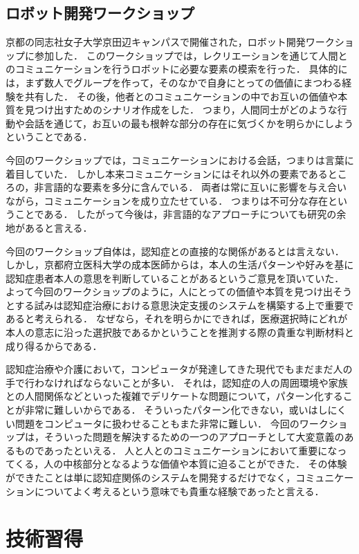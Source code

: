\documentclass[../report]{subfiles}
\begin{document}
\subsection{ロボット開発ワークショップ}
京都の同志社女子大学京田辺キャンパスで開催された，ロボット開発ワークショップに参加した．
このワークショップでは，レクリエーションを通じて人間とのコミュニケーションを行うロボットに必要な要素の模索を行った．
具体的には，まず数人でグループを作って，そのなかで自身にとっての価値にまつわる経験を共有した．
その後，他者とのコミュニケーションの中でお互いの価値や本質を見つけ出すためのシナリオ作成をした．
つまり，人間同士がどのような行動や会話を通じて，お互いの最も根幹な部分の存在に気づくかを明らかにしようということである．

今回のワークショップでは，コミュニケーションにおける会話，つまりは言葉に着目していた．
しかし本来コミュニケーションにはそれ以外の要素であるところの，非言語的な要素を多分に含んでいる．
両者は常に互いに影響を与え合いながら，コミュニケーションを成り立たせている．
つまりは不可分な存在ということである．
したがって今後は，非言語的なアプローチについても研究の余地があると言える．

今回のワークショップ自体は，認知症との直接的な関係があるとは言えない．
しかし，京都府立医科大学の成本医師からは，本人の生活パターンや好みを基に認知症患者本人の意思を判断していることがあるというご意見を頂いていた．
よって今回のワークショップのように，人にとっての価値や本質を見つけ出そうとする試みは認知症治療における意思決定支援のシステムを構築する上で重要であると考えられる．
なぜなら，それを明らかにできれば，医療選択時にどれが本人の意志に沿った選択肢であるかということを推測する際の貴重な判断材料と成り得るからである．

認知症治療や介護において，コンピュータが発達してきた現代でもまだまだ人の手で行わなければならないことが多い．
それは，認知症の人の周囲環境や家族との人間関係などといった複雑でデリケートな問題について，パターン化することが非常に難しいからである．
そういったパターン化できない，或いはしにくい問題をコンピュータに扱わせることもまた非常に難しい．
今回のワークショップは，そういった問題を解決するための一つのアプローチとして大変意義のあるものであったといえる．
人と人とのコミュニケーションにおいて重要になってくる，人の中核部分となるような価値や本質に迫ることができた．
その体験ができたことは単に認知症関係のシステムを開発するだけでなく，コミュニケーションについてよく考えるという意味でも貴重な経験であったと言える．


\section{技術習得}
\end{document}
